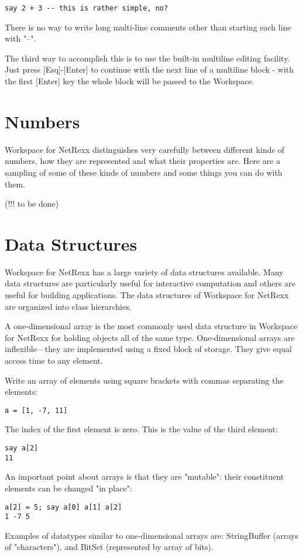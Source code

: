 \begin{verbatim}
say 2 + 3 -- this is rather simple, no?
\end{verbatim}
There is no way to write long multi-line comments other than starting each line with "--".

The third way to accomplish this is to use the built-in multiline editing facility. Just press [Esq]-[Enter] to continue with the next line of a multiline block - with the first [Enter] key the whole block will be passed to the Workspace.

 \section{Numbers}

Workspace for NetRexx distinguishes very carefully between different kinds of numbers, how they are represented and what their properties are. Here are a sampling of some of these kinds of numbers and some things you can do with them.

(!!! to be done)

 \section{Data Structures}

Workspace for NetRexx has a large variety of data structures available. Many data structures are particularly useful for interactive computation and others are useful for building applications. The data structures of Workspace for NetRexx are organized into class hierarchies.

A one-dimensional array is the most commonly used data structure in Workspace for NetRexx for holding objects all of the same type. One-dimensional arrays are inflexible---they are implemented using a fixed block of storage. They give equal access time to any element.

Write an array of elements using square brackets with commas separating the elements:
\begin{verbatim}
a = [1, -7, 11]
\end{verbatim}
The index of the first element is zero. This is the value of the third element:

\begin{verbatim}
say a[2]
11
\end{verbatim}
An important point about arrays is that they are "mutable": their constituent elements can be changed "in place":

\begin{verbatim}
a[2] = 5; say a[0] a[1] a[2]
1 -7 5
\end{verbatim}
Examples of datatypes similar to one-dimensional arrays are: StringBuffer (arrays of "characters"), and BitSet (represented by array of bits).

